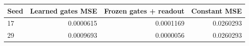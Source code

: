\begin{tabular}{lrrr}\toprule Seed & Learned gates MSE & Frozen gates + readout & Constant MSE\\\midrule
17 & 0.0000615 & 0.0001169 & 0.0260293\\
29 & 0.0009693 & 0.0000056 & 0.0260293\\
\bottomrule\end{tabular}

